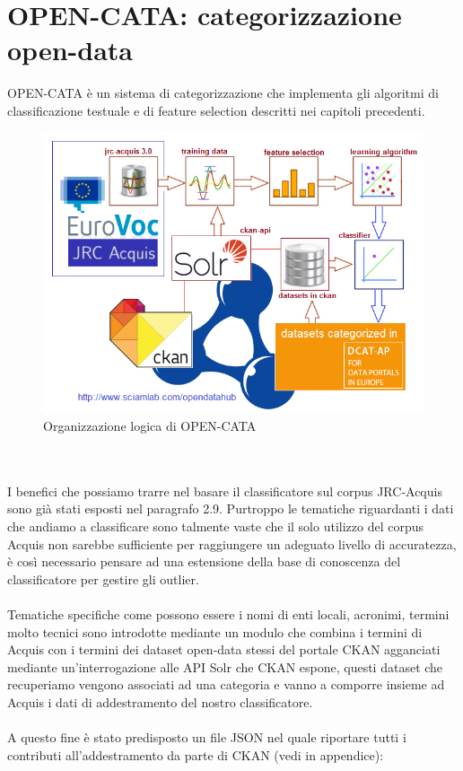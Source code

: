 \documentclass{article}
\theoremstyle{plain}
\theoremstyle{definition}
\begin{document}
\newpage
\section{OPEN-CATA: categorizzazione open-data}
OPEN-CATA è un sistema di categorizzazione che implementa gli algoritmi di classificazione testuale e di feature selection descritti nei capitoli precedenti.
\begin{figure}[htbp]
\begin{center}
\includegraphics[scale=1.00]{img/abstract.png}
\caption{Organizzazione logica di OPEN-CATA}
\end{center}
\end{figure}
\phantom
\\
\\
I benefici che possiamo trarre nel basare il classificatore sul corpus JRC-Acquis sono già stati esposti nel paragrafo 2.9. Purtroppo le tematiche riguardanti i dati che andiamo a classificare sono talmente vaste che il solo utilizzo del corpus Acquis non sarebbe sufficiente per raggiungere un adeguato livello di accuratezza, è così necessario pensare ad una estensione della base di conoscenza del classificatore per gestire gli outlier.
\\
\\
Tematiche specifiche come possono essere i nomi di enti locali, acronimi, termini molto tecnici sono introdotte mediante un modulo che combina i termini di Acquis con i termini dei dataset open-data stessi del portale CKAN agganciati mediante un'interrogazione alle API Solr che CKAN espone, questi dataset che recuperiamo vengono associati ad una categoria e vanno a comporre insieme ad Acquis i dati di addestramento del nostro classificatore.
\\
\\
A questo fine è stato predisposto un file JSON nel quale riportare tutti i contributi all'addestramento da parte di CKAN (vedi  in appendice):
\end{document}
